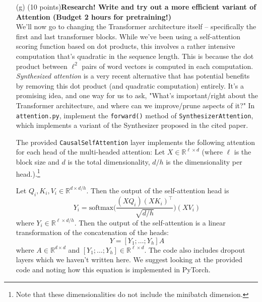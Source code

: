 \documentclass[letterpaper,12pt]{article}
\begin{document}
\begin{itemize}
		
	\item[(g)]
		(10 points)\textbf{Research! Write and try out a more efficient variant of Attention (Budget 2 hours for pretraining!)}\\
		
		We'll now go to changing the Transformer architecture itself -- specifically the first and last transformer blocks.
		While we've been using a self-attention scoring function based on dot products, this involves a rather intensive computation that's quadratic in the sequence length. This is because the dot product between $\ell^2$ pairs of word vectors is computed in each computation. \textit{Synthesized attention} \cite{b3} is a very recent alternative that has potential benefits by removing this dot product (and quadratic computation) entirely. It's a promising idea, and one way for us to ask, "What's important/right about the Transformer architecture, and where can we improve/prune aspects of it?" In \texttt{attention.py}, implement the \texttt{forward()} method of \texttt{SynthesizerAttention}, which implements a variant of the Synthesizer proposed in the cited paper.
		
		The provided \texttt{CausalSelfAttention} layer implements the following attention for each head of the multi-headed attention: Let $X\in \mathbb{R}^{\ell \times d}$ (where $\ell$ is the block size and $d$ is the total dimensionality, $d/h$ is the dimensionality per head.).\footnote{Note that these dimensionalities do not include the minibatch dimension.}
		
		Let $Q_i,K_i,V_i \in \mathbb{R}^{d\times d/h}$.
		Then the output of the self-attention head is 
		\begin{equation} \label{qkv_eqn}
			Y_i = \text{softmax}\bigg(\frac{(XQ_i)(XK_i)^\top}{\sqrt{d/h}}\bigg)(XV_i)
		\end{equation}
		where $Y_i\in\mathbb{R}^{\ell \times d/h}$.
		Then the output of the self-attention is a linear transformation of the concatenation of the heads:
		\begin{equation}
			Y = [Y_1;\dots;Y_h]A
		\end{equation}
		where $A \in\mathbb{R}^{d\times d}$ and $[Y_1;\dots;Y_h]\in\mathbb{R}^{\ell \times d}$.
		The code also includes dropout layers which we haven't written here.
		We suggest looking at the provided code and noting how this equation is implemented in PyTorch.


\end{itemize}
\end{document}
